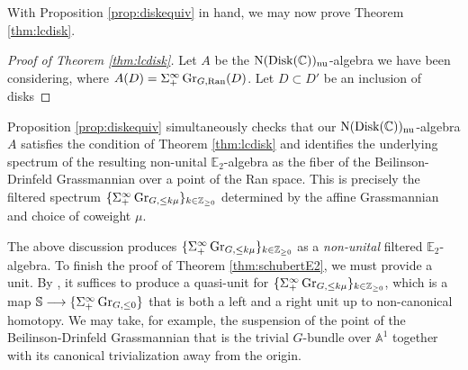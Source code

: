 With Proposition \ref{prop:diskequiv} in hand, we may now prove Theorem \ref{thm:lcdisk}.

\begin{proof}[Proof of Theorem \ref{thm:lcdisk}]
Let $A$ be the $\operatorname{\mathrm{N}} (\mathrm{Disk}(\mathbb{C}))_{\mathrm{nu}}$-algebra we have been considering, where $A(D) = \Sigma^{\infty}_+ \operatorname{\mathrm{Gr}}_{G,\operatorname{\mathrm{Ran}}}(D)$.  Let $D \subset D'$ be an inclusion of disks

\end{proof}

Proposition \ref{prop:diskequiv} simultaneously checks that our $\operatorname{\mathrm{N}} (\mathrm{Disk}(\mathbb{C}))_{\mathrm{nu}}$-algebra $A$ satisfies the condition of Theorem \ref{thm:lcdisk} and identifies the underlying spectrum of the resulting non-unital $\mathbb{E}_2$-algebra as the fiber of the Beilinson-Drinfeld Grassmannian over a point of the Ran space.  This is precisely the filtered spectrum $\{ \Sigma^{\infty}_+ \operatorname{\mathrm{Gr}}_{G,\leq k\mu}\}_{k \in \mathbb{Z}_{\geq 0}}$ determined by the affine Grassmannian and choice of coweight $\mu$.  

The above discussion produces $\{ \Sigma^{\infty}_+ \operatorname{\mathrm{Gr}}_{G,\leq k\mu}\}_{k \in \mathbb{Z}_{\geq 0}}$ as a \textit{non-unital} filtered $\mathbb{E}_2$-algebra.  To finish the proof of Theorem \ref{thm:schubertE2}, we must provide a unit.  By \cite[Theorem 5.4.4.5]{HA}, it suffices to produce a quasi-unit for $\{ \Sigma^{\infty}_+ \operatorname{\mathrm{Gr}}_{G,\leq k\mu}\}_{k \in \mathbb{Z}_{\geq 0}}$, which is a map $\mathbb{S} \longrightarrow \{ \Sigma^{\infty}_+ \operatorname{\mathrm{Gr}}_{G,\leq 0}\}$ that is both a left and a right unit up to non-canonical homotopy.  We may take, for example, the suspension of the point of the Beilinson-Drinfeld Grassmannian that is the trivial $G$-bundle over $\mathbb{A}^1$ together with its canonical trivialization away from the origin.
